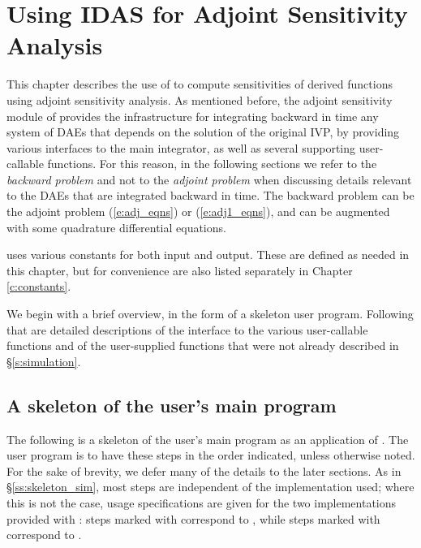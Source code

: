 \chapter{Using IDAS for Adjoint Sensitivity Analysis}\label{s:adjoint}

This chapter describes the use of {\idas} to compute sensitivities of derived 
functions using adjoint sensitivity analysis. As mentioned before, the adjoint
sensitivity module of {\idas} provides the infrastructure for integrating
backward in time any system of DAEs that depends on the solution of the original
IVP, by providing various interfaces to the main {\idas} integrator, as well 
as several supporting user-callable functions. For this reason, in the following
sections we refer to the {\em backward problem} and not to the 
{\em adjoint problem} when discussing details relevant to the DAEs that
are integrated backward in  time. The backward problem can be the adjoint problem
(\ref{e:adj_eqns}) or (\ref{e:adj1_eqns}), and
can be augmented with some quadrature differential equations.

{\idas} uses various constants for both input and output.  These are
defined as needed in this chapter, but for convenience are also listed
separately in Chapter \ref{c:constants}.

We begin with a brief overview, in the form of a skeleton user program.
Following that are detailed descriptions of the interface to the
various user-callable functions and of the user-supplied functions that were not already
described in \S\ref{s:simulation}.

\section{A skeleton of the user's main program}
\label{ss:skeleton_adj}

The following is a skeleton of the user's main program as an application of
{\idas}. The user program is to have these steps in the order indicated, 
unless otherwise noted. For the sake of brevity, we defer many of the details to 
the later sections.
As in \S\ref{ss:skeleton_sim}, most steps are independent of the {\nvector}
implementation used; where this is not the case, usage specifications are given for the
two implementations provided with {\idas}: steps marked with {\p} correspond to 
{\nvecp}, while steps marked with {\s} correspond to {\nvecs}.


